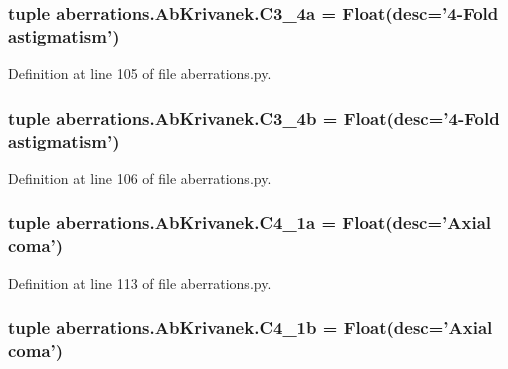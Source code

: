 \hypertarget{classaberrations_1_1_ab_krivanek_a2d7b8b57cf3aa5d096f859e24dac2e8c}{
\subsubsection[{C3\-\_\-4a}]{\setlength{\rightskip}{0pt plus 5cm}tuple aberrations.\-Ab\-Krivanek.\-C3\-\_\-4a = Float(desc='4-\/Fold astigmatism')\hspace{0.3cm}{\ttfamily [static]}}}\label{classaberrations_1_1_ab_krivanek_a2d7b8b57cf3aa5d096f859e24dac2e8c}


Definition at line 105 of file aberrations.\-py.

\hypertarget{classaberrations_1_1_ab_krivanek_a53cdd9582c6e36d5391be28a10193e53}{
\subsubsection[{C3\-\_\-4b}]{\setlength{\rightskip}{0pt plus 5cm}tuple aberrations.\-Ab\-Krivanek.\-C3\-\_\-4b = Float(desc='4-\/Fold astigmatism')\hspace{0.3cm}{\ttfamily [static]}}}\label{classaberrations_1_1_ab_krivanek_a53cdd9582c6e36d5391be28a10193e53}


Definition at line 106 of file aberrations.\-py.

\hypertarget{classaberrations_1_1_ab_krivanek_ae8cc3279df6c913aa9179fae414c1dd9}{
\subsubsection[{C4\-\_\-1a}]{\setlength{\rightskip}{0pt plus 5cm}tuple aberrations.\-Ab\-Krivanek.\-C4\-\_\-1a = Float(desc='Axial coma')\hspace{0.3cm}{\ttfamily [static]}}}\label{classaberrations_1_1_ab_krivanek_ae8cc3279df6c913aa9179fae414c1dd9}


Definition at line 113 of file aberrations.\-py.

\hypertarget{classaberrations_1_1_ab_krivanek_a3840460e6c3a4d80a704e32dd8d9cd7d}{
\subsubsection[{C4\-\_\-1b}]{\setlength{\rightskip}{0pt plus 5cm}tuple aberrations.\-Ab\-Krivanek.\-C4\-\_\-1b = Float(desc='Axial coma')\hspace{0.3cm}{\ttfamily [static]}}}\label{classaberrations_1_1_ab_krivanek_a3840460e6c3a4d80a704e32dd8d9cd7d}


